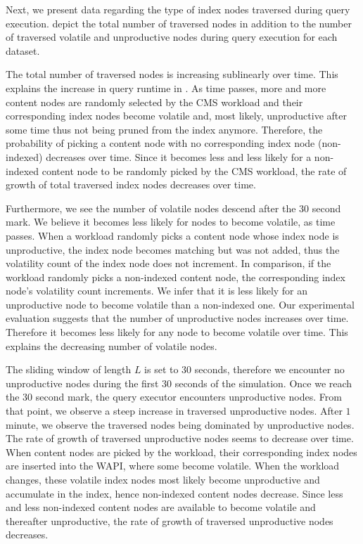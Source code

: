 \documentclass[abstracton,12pt]{scrartcl}
\theoremstyle{definition}
\begin{document}
Next, we present data regarding the type of index nodes traversed during query
execution.
 depict
the total number of traversed nodes in addition to the number of traversed
volatile and unproductive nodes during query execution for each dataset.

The total number of traversed nodes is increasing sublinearly over time. This
explains the increase in query runtime in
.
As time passes, more and more content nodes are randomly
selected by the CMS workload and their corresponding index nodes become volatile
and, most likely, 
unproductive after some time thus not being pruned from the index anymore.
Therefore, the probability of picking a content node with no corresponding index
node (non-indexed)
decreases over time. Since it becomes less and less likely for a non-indexed content node
to be randomly picked by the CMS workload, the rate of growth of total traversed
index nodes decreases over time.

Furthermore, we see the number of volatile nodes descend after the $30$
second mark. We believe it becomes less likely for nodes to become volatile,
as time passes. When a workload randomly picks a content node whose index node is
unproductive, the index
node becomes matching but was not added, thus the volatility count of the index node
does not increment. In comparison, if the workload randomly picks a non-indexed
content node, the corresponding index node's volatility count increments.
We infer that it is less
likely for an unproductive node to become volatile than a non-indexed one.
Our experimental evaluation suggests that the number of
unproductive nodes increases over time. Therefore it becomes less likely for any
node to become volatile over time. This explains the decreasing number of volatile nodes.

The sliding window of length $L$ is set to $30$ seconds, therefore we encounter no
unproductive nodes during the first $30$ seconds of the simulation. Once we
reach the $30$ second mark, the query executor encounters unproductive nodes.
From that point, we observe a steep increase in traversed unproductive nodes.
After $1$ minute, we observe the traversed nodes being dominated by
unproductive nodes. The rate of growth of traversed unproductive nodes seems to
decrease over time. When content nodes are picked by the
workload, their corresponding index nodes are inserted into the WAPI, where some
become volatile. When the workload changes, these volatile index nodes most
likely become unproductive and accumulate in the index, hence non-indexed
content nodes decrease. Since less and less non-indexed content nodes are
available to become volatile and thereafter unproductive, the rate of growth of
traversed unproductive nodes decreases.
\end{document}
